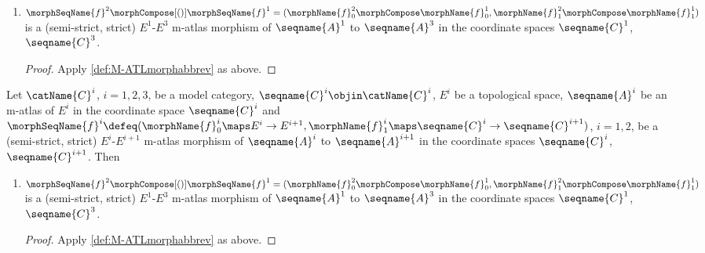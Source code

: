 \documentclass{article}
\begin{document}
\begin{corollary}
\begin{enumerate}[resume]
\item
$
  \morphSeqName{f}^2 \morphCompose[()] \morphSeqName{f}^1 =
  (
    \morphName{f}^2_0 \morphCompose \morphName{f}^1_0,
    \morphName{f}^2_1 \morphCompose \morphName{f}^1_1
  )
$
is a (semi-strict, strict) $E^1$-$E^3$ m-atlas morphism of
$\seqname{A}^1$ to $\seqname{A}^3$ in the coordinate spaces
$\seqname{C}^1$, $\seqname{C}^3$.

\begin{proof}
Apply \cref{def:M-ATLmorphabbrev} as above.
\end{proof}
\end{enumerate}

Let $\catName{C}^i$, $i=1,2,3$, be a model category,
$\seqname{C}^i \objin \catName{C}^i$, $E^i$ be a topological space,
$\seqname{A}^i$ be an m-atlas of $E^i$ in the coordinate space
$\seqname{C}^i$ and
$
  \morphSeqName{f}^i \defeq
    (
      \morphName{f}^i_0 \maps E^i \to E^{i+1},
      \morphName{f}^i_1 \maps \seqname{C}^i \to \seqname{C}^{i+1}
    )
$, $i=1,2$,
be a (semi-strict, strict) $E^i$-$E^{i+1}$ m-atlas morphism of
$\seqname{A}^i$ to $\seqname{A}^{i+1}$ in the coordinate spaces
$\seqname{C}^i$, $\seqname{C}^{i+1}$. Then

\begin{enumerate}[resume]
\item
$
  \morphSeqName{f}^2 \morphCompose[()] \morphSeqName{f}^1 =
    (
      \morphName{f}^2_0 \morphCompose \morphName{f}^1_0,
      \morphName{f}^2_1 \morphCompose \morphName{f}^1_1
    )
$
is a (semi-strict, strict) $E^1$-$E^3$ m-atlas morphism of
$\seqname{A}^1$ to $\seqname{A}^3$ in the coordinate spaces
$\seqname{C}^1$, $\seqname{C}^3$.

\begin{proof}
Apply \cref{def:M-ATLmorphabbrev} as above.
\end{proof}
\end{enumerate}
\end{corollary}
\end{document}

